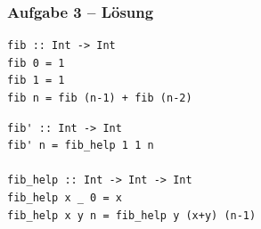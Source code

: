 \documentclass{beamer}
\begin{document}
	\begin{frame}[fragile] \frametitle{Aufgabe 3 -- Lösung}
		\begin{lstlisting}[style=bg]
fib :: Int -> Int
fib 0 = 1
fib 1 = 1
fib n = fib (n-1) + fib (n-2)
		\end{lstlisting}
	
		\begin{lstlisting}[style=bg]
fib' :: Int -> Int
fib' n = fib_help 1 1 n

fib_help :: Int -> Int -> Int
fib_help x _ 0 = x
fib_help x y n = fib_help y (x+y) (n-1)
		\end{lstlisting}
	\end{frame}



%
%	
%
%
%

%
\end{document}
